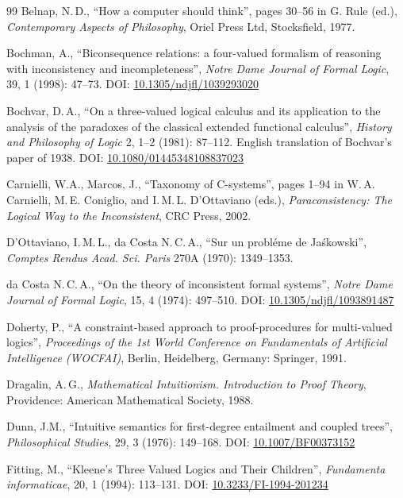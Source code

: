 \documentclass[10pt,a4paper]{article}
\theoremstyle{definition}
\newcommand{\3}{\vspace{.3in}}
\newcommand{\2}{\vspace{.2in}}
\newcommand{\1}{\vspace{.1in}}
\newcommand{\5}{\vspace{.05in}}
\newcommand\DOI[2]{DOI: \href{#1#2}{#2}}
\newcommand{\ts}{\,}
\begin{document}
\begin{thebibliography}{99}
 Belnap, N.\ts D., ``How a computer should think'', pages 30--56 in G. Rule (ed.), \textit{Contemporary Aspects of Philosophy}, Oriel Press Ltd, Stocksfield, 1977.


Bochman, A., ``Biconsequence relations: a four-valued formalism of reasoning with inconsistency and incompleteness'', \textit{Notre Dame Journal of Formal Logic}, 39, 1 (1998): 47--73. 
\DOI{http://dx.doi.org/}{10.1305/ndjfl/1039293020}

 Bochvar, D.\ts A., ``On a three-valued logical calculus and its application to the analysis of the paradoxes of the classical extended functional calculus'', \textit{History and Philosophy of Logic} 2, 1--2 (1981): 87--112. English translation of Bochvar's paper of 1938. \DOI{http://dx.doi.org/}{10.1080/01445348108837023}

Carnielli, W.A., Marcos, J., ``Taxonomy of C-systems'', pages 1--94 in W.\ts A. Carnielli, M.\ts E. Coniglio, and I.\ts M.\ts L. D'Ottaviano (eds.),  \textit{Paraconsistency: The Logical Way to the Inconsistent}, CRC Press, 2002.

D'Ottaviano, I.\ts M.\ts L., da Costa N.\ts C.\ts A., ``Sur un probl\'{e}me de Ja\'{s}kowski'',  \textit{Comptes Rendus Acad. Sci. Paris} 270A (1970): 1349--1353.

da Costa N.\ts C.\ts A., ``On the theory of inconsistent formal systems'', \textit{Notre Dame Journal of Formal Logic}, 15, 4 (1974): 497--510.
\DOI{http://dx.doi.org/}{10.1305/ndjfl/1093891487}

Doherty, P., ``A constraint-based approach to proof-procedures for multi-valued logics'',
\textit{Proceedings of the 1st World Conference on Fundamentals of Artificial Intelligence (WOCFAI)}, Berlin, Heidelberg, Germany: Springer, 1991.

Dragalin, A.\ts G., \textit{Mathematical Intuitionism. Introduction to Proof
Theory}, Providence: American Mathematical Society, 1988.

Dunn, J.M., ``Intuitive semantics for first-degree entailment and coupled trees'', \textit{Philosophical Studies}, 29, 3 (1976): 149--168.
\DOI{http://dx.doi.org/}{10.1007/BF00373152}

Fitting, M., ``Kleene's Three Valued Logics and Their Children'', \textit{Fundamenta informaticae},  20, 1 (1994): 113--131.
\DOI{http://dx.doi.org/}{10.3233/FI-1994-201234}


\end{thebibliography}
\end{document}
